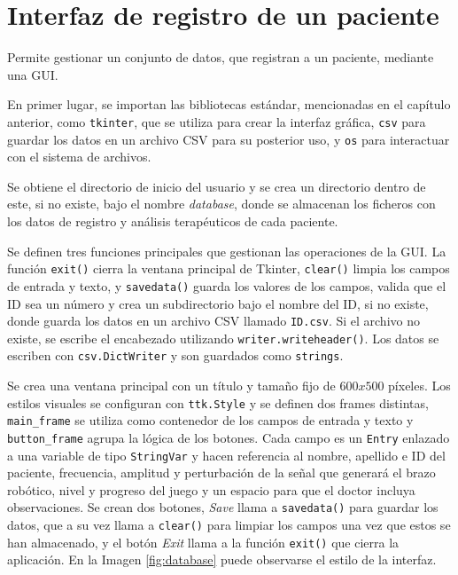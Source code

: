 \section{Interfaz de registro de un paciente}
\label{section:registro}

Permite gestionar un conjunto de datos, que registran a un paciente, mediante una GUI.

En primer lugar, se importan las bibliotecas estándar, mencionadas en el capítulo anterior, como \verb|tkinter|, que se utiliza para crear la interfaz gráfica, \verb|csv| para guardar los datos en un archivo CSV para su posterior uso, y \verb|os| para interactuar con el sistema de archivos.

Se obtiene el directorio de inicio del usuario y se crea un directorio dentro de este, si no existe, bajo el nombre \textit{database}, donde se almacenan los ficheros con los datos de registro y análisis terapéuticos de cada paciente.

Se definen tres funciones principales que gestionan las operaciones de la GUI.
La función \verb|exit()| cierra la ventana principal de Tkinter, \verb|clear()| limpia los campos de entrada y texto, y \verb|savedata()| guarda los valores de los campos, valida que el ID sea un número y crea un subdirectorio bajo el nombre del ID, si no existe, donde guarda los datos en un archivo CSV llamado \verb|ID.csv|.
Si el archivo no existe, se escribe el encabezado utilizando \verb|writer.writeheader()|.
Los datos se escriben con \verb|csv.DictWriter| y son guardados como \verb|strings|.

Se crea una ventana principal con un título y tamaño fijo de $600x500$ píxeles.
Los estilos visuales se configuran con \verb|ttk.Style| y se definen dos frames distintas, \verb|main_frame| se utiliza como contenedor de los campos de entrada y texto y \verb|button_frame| agrupa la lógica de los botones.
Cada campo es un \verb|Entry| enlazado a una variable de tipo \verb|StringVar| y hacen referencia al nombre, apellido e ID del paciente, frecuencia, amplitud y perturbación de la señal que generará el brazo robótico, nivel y progreso del juego y un espacio para que el doctor incluya observaciones.
Se crean dos botones, \textit{Save} llama a \verb|savedata()| para guardar los datos, que a su vez llama a \verb|clear()| para limpiar los campos una vez que estos se han almacenado, y el botón \textit{Exit} llama a la función \verb|exit()| que cierra la aplicación.
En la Imagen \ref{fig:database} puede observarse el estilo de la interfaz.

